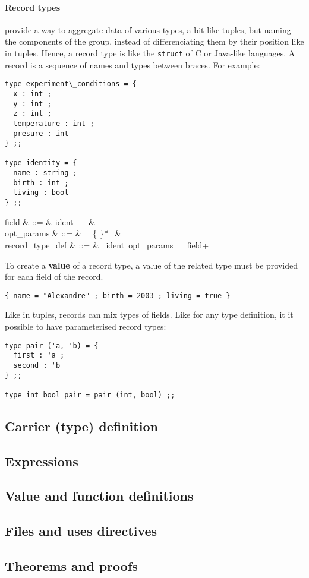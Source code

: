 \paragraph{Record types} provide a way to aggregate data of various
types, a bit like tuples, but naming the components of the group,
instead of differenciating them by their position like in
tuples. Hence, a record type is like the {\tt struct} of C or
Java-like languages. A record is a sequence of names and types between
braces. For example:
{\scriptsize
\begin{lstlisting}
type experiment\_conditions = {
  x : int ;
  y : int ;
  z : int ;
  temperature : int ;
  presure : int
} ;;

type identity = {
  name : string ;
  birth : int ;
  living : bool
} ;;
\end{lstlisting}
}

\vspace{0.2cm}
\begin{syntax}
field & ::= & ident\ \terminal{:}\ \tau\ \terminal{;} & \\
opt\_params & ::= & \epsilon
    \mid \terminal{(}\ \tau\ \{\terminal{,} \tau \}*\ \terminal{)} & \\
record\_type\_def & ::= &
    \ ident\ opt\_params\  \terminal{=}
    \ \terminal{\{} field+ \terminal{\}}
\end{syntax}
\vspace{0.2cm}

To create a {\bf value} of a record type, a value of the related
type must be provided for each field of the record.
{\scriptsize
\begin{lstlisting}
{ name = "Alexandre" ; birth = 2003 ; living = true }
\end{lstlisting}
}
Like in tuples, records can mix types of fields. Like for any type
definition, it it possible to have parameterised record types:
{\scriptsize
\begin{lstlisting}
type pair ('a, 'b) = {
  first : 'a ;
  second : 'b
} ;;

type int_bool_pair = pair (int, bool) ;;
\end{lstlisting}
}


\subsection{Carrier (type) definition}

\subsection{Expressions}

\subsection{Value and function definitions}

\subsection{Files and uses directives}

\subsection{Theorems and proofs}
